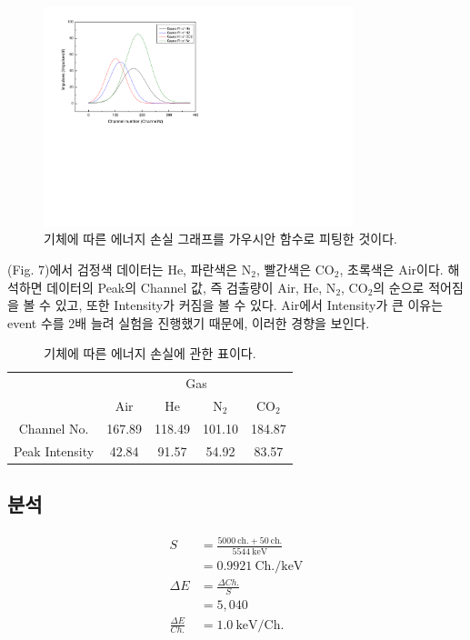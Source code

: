 \documentclass[a4paper, 10pt, nanum]{CSUniSchoolLabReport}
\begin{document}
	\begin{figure}[htb!]
		\centering
		\includegraphics[viewport=1mm 99mm 180mm 200mm, width=9cm, clip=true]{fig7.pdf}
		\caption{기체에 따른 에너지 손실 그래프를 가우시안 함수로 피팅한 것이다.}
		\label{fig:7}
	\end{figure}

	(Fig. 7)에서 검정색 데이터는 He, 파란색은 N$_2$, 빨간색은 CO$_2$, 초록색은 Air이다. 해석하면 데이터의 Peak의 Channel 값, 즉 검출량이 Air, He, N$_2$, CO$_2$의 순으로 적어짐을 볼 수 있고, 또한 Intensity가 커짐을 볼 수 있다. Air에서 Intensity가 큰 이유는 event 수를 2배 늘려 실험을 진행했기 때문에, 이러한 경향을 보인다.


	\begin{table}[htb!]
		\label{tab:3}
		\centering
		\caption{기체에 따른 에너지 손실에 관한 표이다.}
		\begin{tabular}{c|cccc}
			\noalign{\smallskip}\noalign{\smallskip}\hline\hline
			\multirow{2}{*}{Data} &  \multicolumn{4}{c}{Gas} \\
			\cline{2-5}
				& Air & He & N$_2$ & CO$_2$ \\
			\hline
				Channel No. & 167.89 & 118.49 & 101.10 & 184.87 \\
				Peak Intensity & 42.84 & 91.57 & 54.92 & 83.57 \\
			\hline
			\hline
		\end{tabular}
	\end{table}

\subsection{분석}

\begin{align}
	S &= \frac{5000 ~\textrm{ch.} + 50 ~\textrm{ch.}}{5544 ~\textrm{keV}} \\
	&= 0.9921 ~\textrm{Ch./keV} \\
	\varDelta E &= \frac{\varDelta Ch.}{S} \\
	&= 5,040 \\
	\frac{\varDelta E}{Ch.} &= 1.0 ~\textrm{keV/Ch.}
\end{align}
\end{document}
